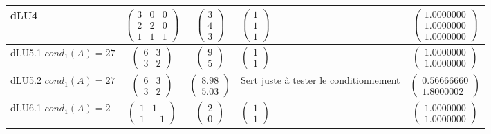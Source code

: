 \documentclass{article}
\theoremstyle{mes_theoremes}
\begin{document}
\begin{tabular}{|p{}|c|c|p{}|c|}
\hline
 dLU4 & $\left(\begin{matrix}3 & 0 & 0 \\ 2 & 2 & 0\\1 & 1 & 1 \end{matrix}\right)$ & $\left(\begin{matrix} 3\\ 4\\ 3\end{matrix}\right)$ & $\left(\begin{matrix} 1\\ 1\\ 1\end{matrix}\right)$ & $\left(\begin{matrix} 1.0000000\\ 1.0000000\\ 1.0000000\end{matrix}\right)$\\
\hline
 dLU5.1 $cond_1(A)=27$ & $\left(\begin{matrix}6 & 3 \\ 3 & 2  \end{matrix}\right)$ & $\left(\begin{matrix} 9\\ 5\end{matrix}\right)$ & $\left(\begin{matrix} 1\\ 1\end{matrix}\right)$ & $\left(\begin{matrix} 1.0000000\\ 1.0000000\end{matrix}\right)$\\
\hline
 dLU5.2 $cond_1(A)=27$ & $\left(\begin{matrix}6 & 3 \\ 3 & 2  \end{matrix}\right)$ & $\left(\begin{matrix} 8.98\\ 5.03\end{matrix}\right)$ & Sert juste à tester le conditionnement& $\left(\begin{matrix} 0.56666660\\ 1.8000002\end{matrix}\right)$\\
\hline
 dLU6.1 $cond_1(A)=2$ & $\left(\begin{matrix}1 & 1 \\ 1 & -1  \end{matrix}\right)$ & $\left(\begin{matrix} 2\\ 0\end{matrix}\right)$ & $\left(\begin{matrix} 1\\ 1\end{matrix}\right)$ & $\left(\begin{matrix} 1.0000000\\ 1.0000000\end{matrix}\right)$\\

\end{tabular}
\end{document}
